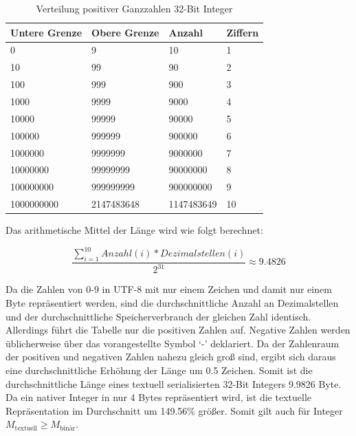 \documentclass[ngerman]{seminarvorlage}
\begin{document}
\begin{table}[H]
  \centering
  \begin{tabular}{|l|l|l|l|} 
  \hline
  \textbf{Untere Grenze} & \textbf{Obere Grenze} & \textbf{Anzahl} & \textbf{Ziffern}         \\ 
  \hline
  0                      & 9                     & 10              & 1                        \\
  10                     & 99                    & 90              & 2                        \\
  100                    & 999                   & 900             & 3                        \\
  1000                   & 9999                  & 9000            & 4                        \\
  10000                  & 99999                 & 90000           & 5                        \\
  100000                 & 999999                & 900000          & 6                        \\
  1000000                & 9999999               & 9000000         & 7                        \\
  10000000               & 99999999              & 90000000        & 8                        \\
  100000000              & 999999999             & 900000000       & 9                        \\
  1000000000             & 2147483648            & 1147483649      & 10                       \\
  \hline
  \end{tabular}
  \caption{Verteilung positiver Ganzzahlen 32-Bit Integer}
\end{table}

Das arithmetische Mittel der Länge wird wie folgt berechnet:

$$\frac{\sum_{i=1}^{10} Anzahl(i) * Dezimalstellen(i)}{2^{31}} \approx 9.4826$$

Da die Zahlen von 0-9 in UTF-8 mit nur einem Zeichen und damit nur einem Byte repräsentiert werden, sind die durchschnittliche Anzahl an Dezimalstellen und der durchschnittliche Speicherverbrauch der gleichen Zahl identisch. Allerdings führt die Tabelle nur die positiven Zahlen auf. Negative Zahlen werden üblicherweise über das vorangestellte Symbol `-' deklariert. Da der Zahlenraum der positiven und negativen Zahlen nahezu gleich groß sind, ergibt sich daraus eine durchschnittliche Erhöhung der Länge um 0.5 Zeichen. Somit ist die durchschnittliche Länge eines textuell serialisierten 32-Bit Integers 9.9826 Byte. Da ein nativer Integer in nur 4 Bytes repräsentiert wird, ist die textuelle Repräsentation im Durchschnitt um 149.56\% größer. Somit gilt auch für Integer $ M_{\text{textuell}} \geq M_{\text{binär}} $.
\end{document}
